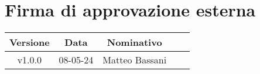 \section*{Firma di approvazione esterna}
    \begin{table}[h]
        \centering
        \renewcommand{\arraystretch}{1.5}
        \begin{tabularx}{0.98\textwidth}
            {c c c >{\centering\arraybackslash}X X}
            \rowcolor{black}
            \textbf{\color{white} Versione} & \textbf{\color{white} Data} & \textbf{\color{white} Nominativo} & \multicolumn{2}{c}{\textbf{\color{white} Firma}}\\ 
            \hline
            
            \multirow{2}{*}{v1.0.0} &\multirow{2}{*}{08-05-24} &\multirow{2}{*}{Matteo Bassani} &&\\

            &&&\multicolumn{2}{c}{\hrulefill}\\
            \hline
        \end{tabularx}
    \end{table}